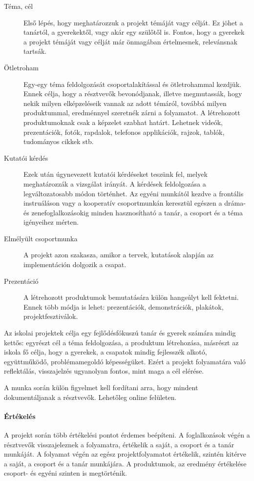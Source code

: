 \begin{description}
      \item[Téma, cél] Első lépés, hogy meghatározzuk a projekt témáját vagy
            célját. Ez jöhet a tanártól, a gyerekektől, vagy akár egy szülőtől is. Fontos, hogy a gyerekek a projekt témáját vagy célját már önmagában értelmesnek, relevánsnak tartsák.

      \item [Ötletroham]  Egy-egy téma feldolgozását csoportalakítással és
            ötletrohammal kezdjük. Ennek célja, hogy a résztvevők bevonódjanak, illetve megmutassák, hogy nekik milyen elképzeléseik vannak az adott témáról, továbbá milyen produktummal, eredménnyel szeretnék zárni a folyamatot. A létrehozott produktumoknak csak a képzelet szabhat határt. Lehetnek videók, prezentációk, fotók, rapdalok, telefonos applikációk, rajzok, tablók, tudományos cikkek stb. 

      \item [Kutatói kérdés] Ezek után úgynevezett kutatói kérdéseket teszünk
            fel, melyek meghatározzák a vizsgálat irányát. A kérdések feldolgozása a legváltozatosabb módon történhet. Az egyéni munkától kezdve a frontális instruáláson vagy a kooperatív csoportmunkán keresztül egészen a dráma- és zenefoglalkozásokig minden hasznosítható a tanár, a csoport és a téma igényeihez mérten.
      \item [Elmélyült csoportmunka] A projekt azon szakasza, amikor a tervek,
            kutatások alapján az implementáción dolgozik a csapat.
      \item [Prezentáció] A létrehozott produktumok bemutatására külön
            hangsúlyt kell fektetni. Ennek több módja is lehet: prezentációk, demonstrációk, plakátok, projektfesztiválok.
\end{description}

Az iskolai projektek célja egy fejlődésfókuszú tanár és gyerek számára mindig kettős: egyrészt cél a téma feldolgozása, a produktum létrehozása, másrészt az iskola fő célja, hogy a gyerekek, a csapatok mindig fejlesszék alkotó, együttműködő, problémamegoldó képességüket. Ezért a projekt folyamatára való reflektálás, visszajelzés ugyanolyan fontos, mint maga a cél elérése.

A munka során külön figyelmet kell fordítani arra, hogy mindent dokumentáljanak a résztvevők. Lehetőleg online felületen.

\paragraph{Értékelés} A projekt során több értékelési pontot érdemes beépíteni.
A foglalkozások végén a résztvevők visszajeleznek a folyamatra, értékelik a saját, a csoport és a tanár munkáját. A folyamat végén az egész projektfolyamatot értékelik, szintén kitérve a saját, a csoport és a tanár munkájára. A produktumok, az eredmény értékelése csoport- és egyéni szinten is megtörténik.

